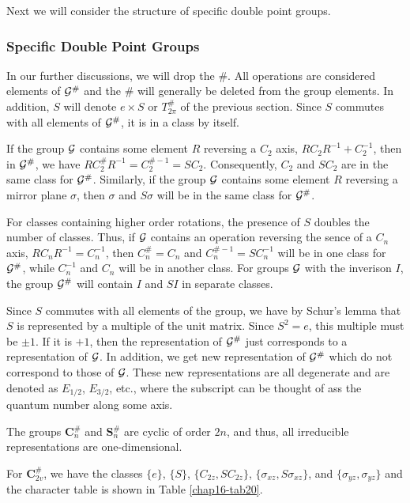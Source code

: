 Next we will consider the structure of specific double point groups.

\subsubsection{Specific Double Point Groups}

In our further discussions, we will drop the $\#$.  All operations 
are considered elements of ${\cal G}^{\#}$ and the $\#$ will 
generally be deleted from the group elements.  In addition, $S$ will 
denote $e \times S$ or $T^{\#}_{2\pi}$ of the previous section.  
Since $S$ commutes with all elements of ${\cal G}^{\#}$, it is in a 
class by itself.

If the group ${\cal G}$ contains some element $R$ reversing a $C_2$ 
axis, $RC_2R^{-1} + C_2^{-1}$, then in ${\cal G}^{\#}$, we have 
$RC_2^{\#}R^{-1} = C_2^{\#-1} = SC_2$.  Consequently, $C_2$ and $SC_2$ 
are in the same class for ${\cal G}^{\#}$.  Similarly, if the group 
${\cal G}$ contains some element $R$ reversing a mirror plane 
$\sigma$, then $\sigma$ and $S\sigma$ will be in the same class for 
${\cal G}^{\#}$.

For classes containing higher order rotations, the presence of $S$ 
doubles the number of classes.  Thus, if ${\cal G}$ contains an 
operation reversing the sence of a $C_n$ axis, $RC_nR^{-1} = 
C_n^{-1}$, then $C_n^{\#} = C_n$ and $C_n^{\#-1} = SC_n^{-1}$ will be 
in one class for ${\cal G}^{\#}$, while $C_n^{-1}$ and $C_n$ will be 
in another class.  For groups ${\cal G}$ with the inverison $I$, the 
group ${\cal G}^{\#}$ will contain $I$ and $SI$ in separate classes.

Since $S$ commutes with all elements of the group, we have by Schur's 
lemma that $S$ is represented by a multiple of the unit matrix.  
Since $S^2 = e$, this multiple must be $\pm 1$. If it is $+1$, then 
the representation of ${\cal G}^{\#}$ just corresponds to a 
representation of ${\cal G}$.  In addition, we get new representation 
of ${\cal G}^{\#}$ which do not correspond to those of ${\cal G}$. 
These new representations are all degenerate and are denoted as 
$E_{1/2}$, $E_{3/2}$, etc., where the subscript can be thought of ass 
the quantum number along some axis.

The groups {\bf C}$_n^{\#}$ and {\bf S}$_n^{\#}$ are cyclic of 
order $2n$, and thus, all irreducible representations are 
one-dimensional.

For {\bf C}$_{2v}^{\#}$, we have the classes $\{e\}$, $\{S\}$,
$\{C_{2z},SC_{2z}\}$, $\{\sigma_{xz},S\sigma_{xz}\}$, and
$\{\sigma_{yz},\sigma_{yz}\}$ and the character table is shown in
Table \ref{chap16-tab20}.

